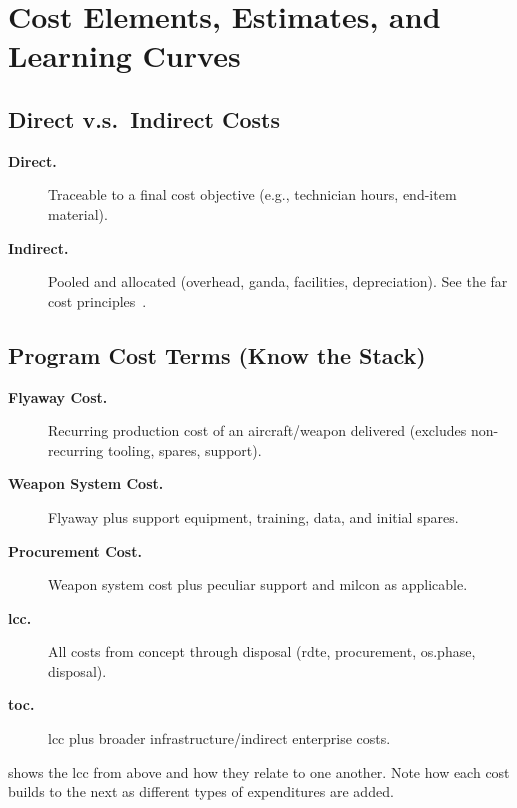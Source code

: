 \documentclass[../main.tex]{subfiles}
\begin{document}

\section{Cost Elements, Estimates, and Learning Curves}

\subsection{Direct v.s.\ Indirect Costs}
\begin{description}
  \item[\textbf{Direct.}] Traceable to a final cost objective (e.g., technician hours, end-item material).
  \item[\textbf{Indirect.}] Pooled and allocated (overhead, \ac{ganda}, facilities, depreciation). See the \ac{far} cost principles~\autocite{FAR}.
\end{description}

\subsection{Program Cost Terms (Know the Stack)}
\begin{description}
  \item[\textbf{Flyaway Cost.}] Recurring production cost of an aircraft/weapon delivered (excludes non-recurring tooling, spares, support).
  \item[\textbf{Weapon System Cost.}] Flyaway plus support equipment, training, data, and initial spares.
  \item[\textbf{Procurement Cost.}] Weapon system cost plus peculiar support and \ac{milcon} as applicable.
  \item[\textbf{\ac{lcc}.}] All costs from concept through disposal (\ac{rdte}, procurement, \ac{os.phase}, disposal).
  \item[\textbf{\ac{toc}.}] \ac{lcc} plus broader infrastructure/indirect enterprise costs.
\end{description}

\Fig{\ref{fig:lcc_composition}} shows the \ac{lcc} from above and how they relate to one another.  Note how each cost builds to the next as different types of expenditures are added.
\end{document}
